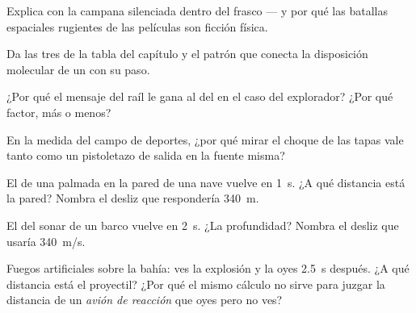 \begin{exercise}[$\star$]\label{exo:g7:sound-production:3}
Explica con  la campana silenciada dentro del frasco --- y
por qué las batallas espaciales rugientes de las películas son ficción
física.
\end{exercise}

\begin{exercise}[$\star$]\label{exo:g7:sound-production:4}
Da las tres  de la tabla del capítulo y el patrón que
conecta la disposición molecular de un  con su paso.
\end{exercise}

\begin{exercise}[$\star$]\label{exo:g7:sound-production:5}
¿Por qué el mensaje del raíl le gana al del  en el caso del
explorador? ¿Por qué factor, más o menos?
\end{exercise}

\begin{exercise}[$\star$]\label{exo:g7:sound-production:6}
En la medida del campo de deportes, ¿por qué mirar el choque de las
tapas vale tanto como un pistoletazo de salida en la fuente misma?
\end{exercise}

\begin{exercise}[$\star$]\label{exo:g7:sound-production:7}
El  de una palmada en la pared de una nave vuelve en
\qty{1}{s}. ¿A qué distancia está la pared? Nombra el desliz que
respondería \qty{340}{m}.
\end{exercise}

\begin{exercise}[$\star$]\label{exo:g7:sound-production:8}
El  del sonar de un barco vuelve en \qty{2}{s}. ¿La
profundidad? Nombra el desliz que usaría \qty{340}{m/s}.
\end{exercise}

\begin{exercise}[$\star\star$]\label{exo:g7:sound-production:9}
Fuegos artificiales sobre la bahía: ves la explosión y la oyes
\qty{2.5}{s} después. ¿A qué distancia está el proyectil? ¿Por qué el
mismo cálculo no sirve para juzgar la distancia de un \emph{avión de
reacción} que oyes pero no ves?
\end{exercise}

